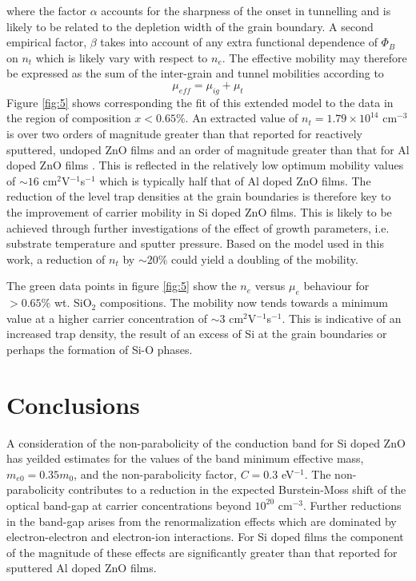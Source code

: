 \documentclass[preprint]{elsarticle}
\begin{document}
where the factor $\alpha$ accounts for the sharpness of the onset in tunnelling and is likely to be related to the depletion width of the grain boundary. A second empirical factor, $\beta$ takes into account of any extra functional dependence of $\Phi_B$ on $n_t$ which is likely vary with respect to $n_e$. The effective mobility may therefore be expressed as the sum of the inter-grain and tunnel mobilities according to
\begin{equation}
\label{eqn:14}
\mu_{eff} = \mu_{ig}+\mu_{t}
\end{equation}
Figure \ref{fig:5} shows corresponding the fit of this extended model to the data in the region of composition $x<0.65\%$. An extracted value of $n_t = 1.79\times10^{14}$ cm$^{-3}$ is over two orders of magnitude greater than that reported for reactively sputtered, undoped ZnO films \cite{Carcia2003} and an order of magnitude greater than that for Al doped ZnO films \cite{Shigesato2003}. This is reflected in the relatively low optimum mobility values of $\sim16$ cm$^{2}$V$^{-1}$s$^{-1}$ which is typically half that of Al doped ZnO films. The reduction of the level trap densities at the grain boundaries is therefore key to the improvement of carrier mobility in Si doped ZnO films. This is likely to be achieved through further investigations of the effect of growth parameters, i.e. substrate temperature and sputter pressure. Based on the model used in this work, a reduction of $n_t$ by $\sim20\%$ could yield a doubling of the mobility.

The green data points in figure \ref{fig:5} show the $n_e$ versus $\mu_e$ behaviour for $>0.65\%$ wt. SiO$_2$ compositions. The mobility now tends towards a minimum value at a higher carrier concentration of $\sim 3$ cm$^{2}$V$^{-1}$s$^{-1}$. This is indicative of an increased trap density, the result of an excess of Si at the grain boundaries or perhaps the formation of Si-O phases.  

\section{Conclusions}
\label{sec:4}
A consideration of the non-parabolicity of the conduction band for Si doped ZnO has yeilded estimates for the values of the band minimum effective mass, $m_{e0} =0.35m_0$, and the non-parabolicity factor, $C=0.3$ eV$^{-1}$. The non-parabolicity contributes to a reduction in the expected Burstein-Moss shift of the optical band-gap at carrier concentrations beyond $10^{20}$ cm$^{-3}$. Further reductions in the band-gap arises from the renormalization effects which are dominated by electron-electron and electron-ion interactions. For Si doped films the component of the magnitude of these effects are significantly greater than that reported for sputtered Al doped ZnO films.
\end{document}
